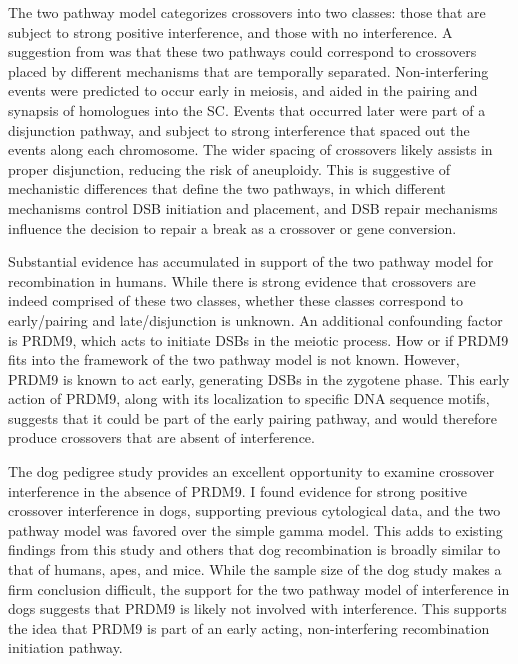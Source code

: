 The two pathway model categorizes crossovers into two classes: those that are subject to strong positive interference, and those with no interference.
A suggestion from \citet{Housworth2003} was that these two pathways could correspond to crossovers placed by different mechanisms that are temporally separated.
Non-interfering events were predicted to occur early in meiosis, and aided in the pairing and synapsis of homologues into the SC.
Events that occurred later were part of a disjunction pathway, and subject to strong interference that spaced out the events along each chromosome.
The wider spacing of crossovers likely assists in proper disjunction, reducing the risk of aneuploidy.
This is suggestive of mechanistic differences that define the two pathways, in which different mechanisms
control DSB initiation and placement, and DSB repair mechanisms influence the decision to repair a break as a crossover or gene conversion\cite{Baudat2007,Berchowitz2010,Stahl2010}.

Substantial evidence has accumulated in support of the two pathway model for recombination in humans\cite{Housworth2003,Fledel-Alon2009,Campbell2015}.
While there is strong evidence that crossovers are indeed comprised of these two classes, whether these classes correspond to early/pairing and late/disjunction is unknown.
An additional confounding factor is PRDM9, which acts to initiate DSBs in the meiotic process.
How or if PRDM9 fits into the framework of the two pathway model is not known.
However, PRDM9 is known to act early, generating DSBs in the zygotene phase\cite{Hayashi2005}.
This early action of PRDM9, along with its localization to specific DNA sequence motifs, suggests that it could be part of the early pairing pathway, and would therefore produce crossovers that are absent of interference.

The dog pedigree study provides an excellent opportunity to examine crossover interference in the absence of PRDM9.
I found evidence for strong positive crossover interference in dogs, supporting previous cytological data\cite{Basheva2008}, and the two pathway model was favored over the simple gamma model.
This adds to existing findings from this study and others\cite{Axelsson2012,Auton2013,Wong2010} that dog recombination is broadly similar to that of humans, apes, and mice.
While the sample size of the dog study makes a firm conclusion difficult, 
the support for the two pathway model of interference in dogs suggests that PRDM9 is likely not involved with interference.
This supports the idea that PRDM9 is part of an early acting, non-interfering recombination initiation pathway.

